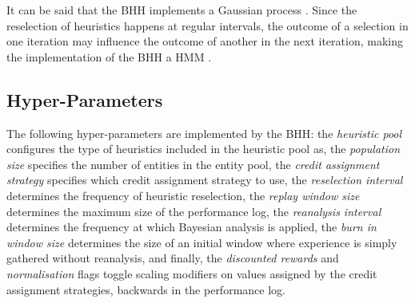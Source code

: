 It can be said that the \acs{BHH} implements a Gaussian process \cite{ref:gortler:2019}. Since the reselection of heuristics happens at regular intervals, the outcome of a selection in one iteration may influence the outcome of another in the next iteration, making the implementation of the \acs{BHH} a \acf{HMM} \cite{ref:rabiner:1986}.


\subsection{Hyper-Parameters}\label{sec:bhh:hyper_parameters}

The following hyper-parameters are implemented by the \acs{BHH}: the \textit{heuristic pool} configures the type of heuristics included in the heuristic pool as, the \textit{population size} specifies the number of entities in the entity pool, the \textit{credit assignment strategy} specifies which credit assignment strategy to use, the \textit{reselection interval} determines the frequency of heuristic reselection, the \textit{replay window size} determines the maximum size of the performance log, the \textit{reanalysis interval} determines the frequency at which Bayesian analysis is applied, the \textit{burn in window size} determines the size of an initial window where experience is simply gathered without reanalysis, and finally, the \textit{discounted rewards} and \textit{normalisation} flags toggle scaling modifiers on values assigned by the credit assignment strategies, backwards in the performance log.
